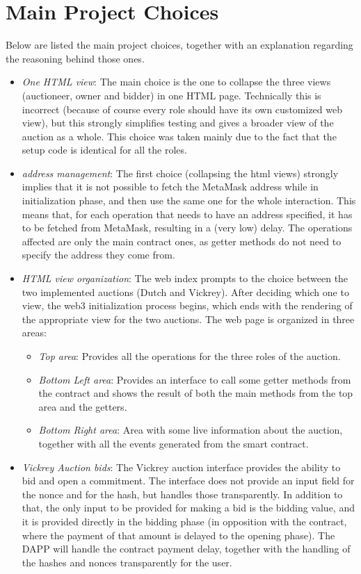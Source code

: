 \documentclass[11pt, a4paper]{report}
\begin{document}
\section*{Main Project Choices}
Below are listed the main project choices, together with an explanation regarding the reasoning behind those ones.
\begin{itemize}
	\item \emph{One HTML view}: The main choice is the one to collapse the three views (auctioneer, owner and bidder) in one HTML page. Technically this is incorrect (because of course every role should have its own customized web view), but this strongly simplifies testing and gives a broader view of the auction as a whole. This choice was taken mainly due to the fact that the setup code is identical for all the roles.
	\item \emph{address management}: The first choice (collapsing the html views) strongly implies that it is not possible to fetch the MetaMask address while in initialization phase, and then use the same one for the whole interaction. This means that, for each operation that needs to have an address specified, it has to be fetched from MetaMask, resulting in a (very low) delay. The operations affected are only the main contract ones, as getter methods do not need to specify the address they come from. 
	\item \emph{HTML view organization}: The web index prompts to the choice between the two implemented auctions (Dutch and Vickrey). After deciding which one to view, the web3 initialization process begins, which ends with the rendering of the appropriate view for the two auctions. The web page is organized in three areas:
	\begin{itemize}
		\item \emph{Top area}: Provides all the operations for the three roles of the auction.
		\item \emph{Bottom Left area}: Provides an interface to call some getter methods from the contract and shows the result of both the main methods from the top area and the getters.
		\item \emph{Bottom Right area}: Area with some live information about the auction, together with all the events generated from the smart contract.
	\end{itemize}
	\item \emph{Vickrey Auction bids}: The Vickrey auction interface provides the ability to bid and open a commitment. The interface does not provide an input field for the nonce and for the hash, but handles those transparently. In addition to that, the only input to be provided for making a bid is the bidding value, and it is provided directly in the bidding phase (in opposition with the contract, where the payment of that amount is delayed to the opening phase). The DAPP will handle the contract payment delay, together with the handling of the hashes and nonces transparently for the user.
\end{itemize}
\end{document}
